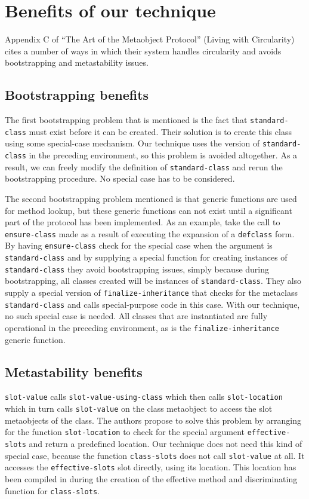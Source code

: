 \section{Benefits of our technique}
\label{sec-benefits}

Appendix C of ``The Art of the Metaobject Protocol''
\cite{Kiczales:1991:AMP:574212} (Living with Circularity) cites a
number of ways in which their system handles circularity and avoids
bootstrapping and metastability issues.

\subsection{Bootstrapping benefits}

The first bootstrapping problem that is mentioned is the fact that
\texttt{standard-class} must exist before it can be created.  Their
solution is to create this class using some special-case mechanism.
Our technique uses the version of \texttt{standard-class} in the
preceding environment, so this problem is avoided altogether.  As a
result, we can freely modify the definition of
\texttt{standard-class} and rerun the bootstrapping procedure.  No
special case has to be considered.

The second bootstrapping problem mentioned is that generic functions
are used for method lookup, but these generic functions can not exist
until a significant part of the protocol has been implemented.  As an
example, take the call to \texttt{ensure-class} made as a result of
executing the expansion of a \texttt{defclass} form.  By having
\texttt{ensure-class} check for the special case when the argument is
\texttt{standard-class} and by supplying a special function for
creating instances of \texttt{standard-class} they avoid bootstrapping
issues, simply because during bootstrapping, all classes created will
be instances of \texttt{standard-class}.  They also supply a special
version of \texttt{finalize-inheritance} that checks for the metaclass
\texttt{standard-class} and calls special-purpose code in this case.
With our technique, no such special case is needed.  All
classes that are instantiated are fully operational in the preceding
environment, as is the \texttt{finalize-inheritance} generic function.

\subsection{Metastability benefits}

\texttt{slot-value} calls \texttt{slot-value-using-class} which then
calls \texttt{slot-location} which in turn calls \texttt{slot-value}
on the class metaobject to access the slot metaobjects of the class.
The authors propose to solve this problem by arranging for the function
\texttt{slot-location} to check for the special argument
\texttt{effective-slots} and return a predefined location.  Our
technique does not need this kind of special case, because the function
\texttt{class-slots} does not call \texttt{slot-value} at all.  It
accesses the \texttt{effective-slots} slot directly, using its
location.  This location has been compiled in during the creation of
the effective method and discriminating function for
\texttt{class-slots}.

